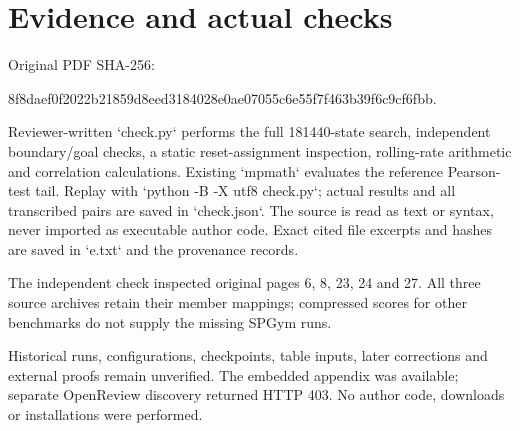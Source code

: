 \documentclass[10pt]{article}
\begin{document}
\section*{Evidence and actual checks}
Original PDF SHA-256:\par
8f8daef0f2022b21859d8eed3184028e0ae07055c6e55f7f463b39f6c9cf6fbb.\par
Reviewer-written `check.py` performs the full 181440-state search, independent boundary/goal checks, a static reset-assignment inspection, rolling-rate arithmetic and correlation calculations. Existing `mpmath` evaluates the reference Pearson-test tail. Replay with `python -B -X utf8 check.py`; actual results and all transcribed pairs are saved in `check.json`. The source is read as text or syntax, never imported as executable author code. Exact cited file excerpts and hashes are saved in `e.txt` and the provenance records.\par
The independent check inspected original pages 6, 8, 23, 24 and 27. All three source archives retain their member mappings; compressed scores for other benchmarks do not supply the missing SPGym runs.\par
Historical runs, configurations, checkpoints, table inputs, later corrections and external proofs remain unverified. The embedded appendix was available; separate OpenReview discovery returned HTTP 403. No author code, downloads or installations were performed.\par
\end{document}
